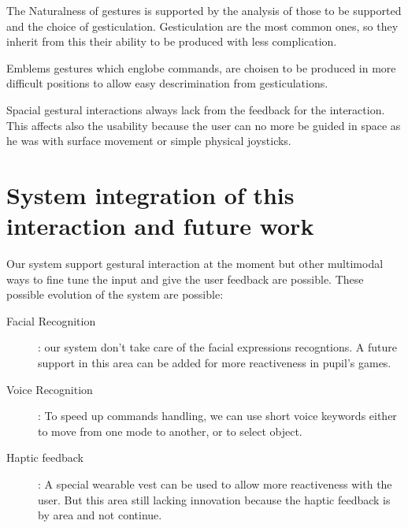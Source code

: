\documentclass{llncs}
\newcommand\ignore[1]{}
\begin{document}
The Naturalness of gestures is supported by the analysis of those to be
supported and the choice of gesticulation.
Gesticulation are the most common ones, so they inherit from this their
ability to be produced with less complication.

Emblems gestures which englobe commands, are choisen to be produced in more
difficult positions to allow easy descrimination from gesticulations.

Spacial gestural interactions always lack from the feedback for the interaction.
This affects also the usability because the user can no more be guided in space
as he was with surface movement or simple physical joysticks.

\section{System integration of this interaction and future work}

Our system support gestural interaction at the moment but other multimodal ways
to fine tune the input and give the user feedback are possible.
These possible evolution of the system are possible:

\begin{description}
 \item[Facial Recognition]: our system don't take care of the facial expressions
recogntions. A future support in this area can be added for more reactiveness in
pupil's games.
 \item[Voice Recognition]: To speed up commands handling, we can use short voice
keywords either to move from one mode to another, or to select object.
 \item[Haptic feedback]: A special wearable vest can be used to allow more
reactiveness with the user. But this area still lacking innovation because the
haptic feedback is by area and not continue.
\end{description}

\ignore{
Gesture + facial recog.
Voice recognition
Haptic 
--
Naturalness came from the analysis of gestures used in talk shows.
(gestures used many times means nature gestures)
Reverse thinking.
Usability in the context of RevTV ??
}


\end{document}
